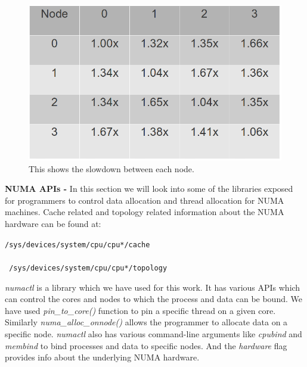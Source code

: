 \begin{figure}
    \centering
    \includegraphics[scale=0.35]{numaMatrix.png}
    \caption{This shows the slowdown between each node. }
    \label{fig:numaMatrix}
\end{figure}

\textbf{NUMA APIs - }
In this section we will look into some of the libraries exposed for programmers to control data allocation and thread allocation for NUMA machines.
Cache related and topology related information about the NUMA hardware can be found at:
 
\texttt{/sys/devices/system/cpu/cpu*/cache } \\
\\
\texttt{ /sys/devices/system/cpu/cpu*/topology }

\textit{numactl} is a library which we have used for this work.
It has various APIs which can control the cores and nodes to which the process and data can be bound.
We have used \textit{pin_to_core()} function to pin a specific thread on a given core.
Similarly \textit{numa_alloc_onnode()} allows the programmer to allocate data on a specific node.
\textit{numactl} also has various command-line arguments like \textit{cpubind} and \textit{membind} to bind processes and data to specific nodes.
And the \textit{hardware} flag provides info about the underlying NUMA hardware.
